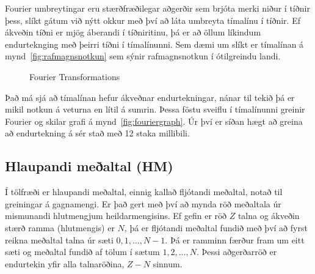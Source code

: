 \documentclass{article}
\begin{document}
Fourier umbreytingar eru stærðfræðilegar aðgerðir
sem brjóta merki niður í tíðnir þess, slíkt gátum við nýtt okkur með því að láta
umbreyta tímalínu í tíðnir. 
Ef ákveðin tíðni er mjög áberandi í tíðniritinu, þá er að öllum líkindum endurteknging með þeirri tíðni í tímalínunni. 
Sem dæmi um slíkt er tímalínan á mynd~\ref{fig:rafmagnsnotkun} sem sýnir rafmagnsnotkun í ótilgreindu landi.


\begin{figure}[H]
  \centering
  \caption{Fourier Transformations}
  \label{fig:fourier}
\end{figure}

Það má sjá að tímalínan hefur ákveðnar endurtekningar,
nánar til tekið þá er mikil notkun á veturna en lítil á
sumrin.
Þessa föstu sveiflu í tímalínunni greinir Fourier og
skilar grafi á mynd~\ref{fig:fouriergraph}. 
Úr því er síðan hægt að greina að endurtekning á sér stað með 12 staka millibili.




\subsection{Hlaupandi meðaltal (HM)}
Í tölfræði er hlaupandi meðaltal, einnig kallað
fljótandi meðaltal, notað til greiningar á gagnamengi. 
Er það gert með því að mynda röð meðaltala úr
mismunandi hlutmengjum heildarmengisins.
Ef gefin er röð $Z$ talna og ákveðin stærð ramma
(hlutmengis) er $N$, þá er fljótandi meðaltal fundið
með því að fyrst reikna meðaltal 
talna úr sæti $0,1,\dots,N-1$. Þá er ramminn færður
fram um eitt sæti og meðaltal fundið af tölum í sætum
$1,2,\dots,N$. 
Þessi aðgerðarröð er endurtekin yfir alla talnaröðina,
$Z-N$ sinnum.  \\
\end{document}
